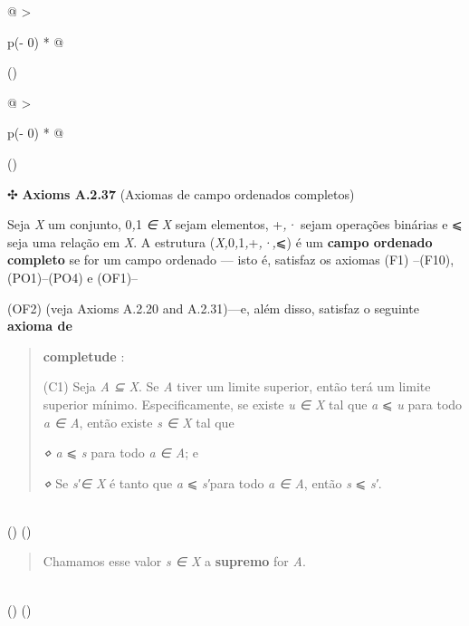 \documentclass[
]{article}
\begin{document}
\begin{longtable}[]{@{}
  >{\raggedright\arraybackslash}p{(\columnwidth - 0\tabcolsep) * }@{}}
\toprule()
\begin{minipage}[b]{\linewidth}\raggedright
\begin{longtable}[]{@{}
  >{\raggedright\arraybackslash}p{(\columnwidth - 0\tabcolsep) * }@{}}
\toprule()
\begin{minipage}[b]{\linewidth}\raggedright
✣ \textbf{Axioms A.2.37} (Axiomas de campo ordenados completos)

Seja \emph{X} um conjunto, 0\emph{,}1 \emph{∈ X} sejam elementos,
+\emph{,·} sejam operações binárias e ⩽ seja uma relação em \emph{X}. A
estrutura (\emph{X,}0\emph{,}1\emph{,}+\emph{,·,}⩽) é um \textbf{campo
ordenado completo} se for um campo ordenado --- isto é, satisfaz os
axiomas (F1) --(F10), (PO1)--(PO4) e (OF1)--

(OF2) (veja Axioms A.2.20 and A.2.31)---e, além disso, satisfaz o
seguinte \textbf{axioma de}

\begin{quote}
\textbf{completude} :

(C1) Seja \emph{A ⊆ X}. Se \emph{A} tiver um limite superior, então terá
um limite superior mínimo. Especificamente, se existe \emph{u ∈ X} tal
que \emph{a} ⩽ \emph{u} para todo \emph{a ∈ A}, então existe \emph{s ∈
X} tal que

\emph{⋄ a} ⩽ \emph{s} para todo \emph{a ∈ A}; e

\emph{⋄} Se \emph{s′∈ X} é tanto que \emph{a} ⩽ \emph{s′}para todo
\emph{a ∈ A}, então \emph{s} ⩽ \emph{s′}.
\end{quote}
\end{minipage} \\
\midrule()
\endhead
\bottomrule()
\end{longtable}

\begin{quote}
Chamamos esse valor \emph{s ∈ X} a \textbf{supremo} for \emph{A}.
\end{quote}
\end{minipage} \\
\midrule()
\endhead
\bottomrule()
\end{longtable}
\end{document}
